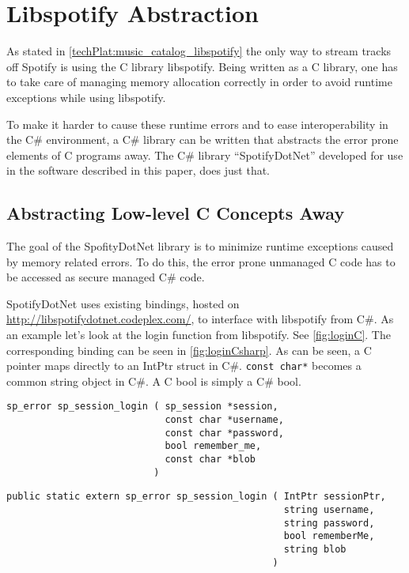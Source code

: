 \section{Libspotify Abstraction}
\label{imp:libspotify}
As stated in \cref{techPlat:music_catalog_libspotify} the only way to stream tracks off Spotify is using the C library libspotify. Being written as a C library, one has to take care of managing memory allocation correctly in order to avoid runtime exceptions while using libspotify.

To make it harder to cause these runtime errors and to ease interoperability in the C\# environment, a C\# library can be written that abstracts the error prone elements of C programs away. The C\# library \enquote{SpotifyDotNet} developed for use in the software described in this paper, does just that.

\subsection{Abstracting Low-level C Concepts Away}
\label{libspotify:abstracting_low_level_c_concepts_away}

The goal of the SpofityDotNet library is to minimize runtime exceptions caused by memory related errors. To do this, the error prone unmanaged C code has to be accessed as secure managed C\# code.

SpotifyDotNet uses existing bindings, hosted on \url{http://libspotifydotnet.codeplex.com/}, to interface with libspotify from C\#. As an example let's look at the login function from libspotify. See \cref{fig:loginC}. The corresponding binding can be seen in \cref{fig:loginCsharp}. As can be seen, a C pointer maps directly to an IntPtr struct in C\#. \lstinline|const char*| becomes a common string object in C\#. A C bool is simply a C\# bool.

\begin{lstlisting}[caption = {Libspotify login function prototype - C}, label = {fig:loginC}]
sp_error sp_session_login ( sp_session *session,
                            const char *username,
                            const char *password,
                            bool remember_me,
                            const char *blob
                          )
\end{lstlisting}

\begin{lstlisting}[caption = {Login method using a external implementation from libspotify.dll - C\#}, label={fig:loginCsharp}]
public static extern sp_error sp_session_login ( IntPtr sessionPtr,
                                                 string username,
                                                 string password,
                                                 bool rememberMe,
                                                 string blob
                                               )
\end{lstlisting}

